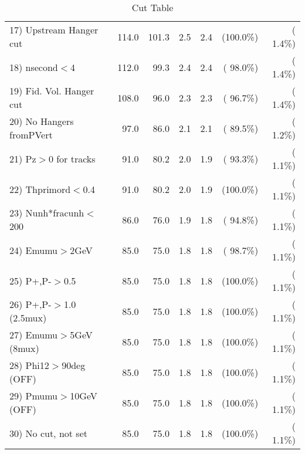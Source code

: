 \begin{table}[h!]
\begin{tabular}{||l||r|r|r|r|r|r||}
 17) Upstream Hanger cut  &        114.0 &        101.3 &          2.5 &          2.4 & (100.0\%) & (  1.4\%) \\
 18) nsecond$<$4          &        112.0 &         99.3 &          2.4 &          2.4 & ( 98.0\%) & (  1.4\%) \\
 19) Fid. Vol. Hanger cut &        108.0 &         96.0 &          2.3 &          2.3 & ( 96.7\%) & (  1.4\%) \\
 20) No Hangers fromPVert &         97.0 &         86.0 &          2.1 &          2.1 & ( 89.5\%) & (  1.2\%) \\
 21) Pz$>$0 for tracks    &         91.0 &         80.2 &          2.0 &          1.9 & ( 93.3\%) & (  1.1\%) \\
 22) Thprimord$<$0.4      &         91.0 &         80.2 &          2.0 &          1.9 & (100.0\%) & (  1.1\%) \\
 23) Nunh*fracunh$<$200   &         86.0 &         76.0 &          1.9 &          1.8 & ( 94.8\%) & (  1.1\%) \\
 24) Emumu$>$2GeV         &         85.0 &         75.0 &          1.8 &          1.8 & ( 98.7\%) & (  1.1\%) \\
 25) P+,P-$>$0.5          &         85.0 &         75.0 &          1.8 &          1.8 & (100.0\%) & (  1.1\%) \\
 26) P+,P-$>$1.0 (2.5mux) &         85.0 &         75.0 &          1.8 &          1.8 & (100.0\%) & (  1.1\%) \\
 27) Emumu$>$5GeV  (8mux) &         85.0 &         75.0 &          1.8 &          1.8 & (100.0\%) & (  1.1\%) \\
 28) Phi12$>$90deg  (OFF) &         85.0 &         75.0 &          1.8 &          1.8 & (100.0\%) & (  1.1\%) \\
 29) Pmumu$>$10GeV  (OFF) &         85.0 &         75.0 &          1.8 &          1.8 & (100.0\%) & (  1.1\%) \\
 30) No cut, not set      &         85.0 &         75.0 &          1.8 &          1.8 & (100.0\%) & (  1.1\%) \\
 \hline
 \hline
 \end{tabular}
 \caption{Cut Table           }
 \label{tab-cutcohjpsi-mumu_cohpip}
 \end{table}
